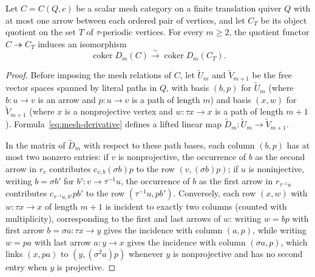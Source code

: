 \begin{proposition}
\label{prop:periodic-localization}
Let $C=C(Q,c)$ be a scalar mesh category on a finite translation quiver $Q$
with at most one arrow between each ordered pair of vertices, and let $C_T$
be its object quotient on the set $T$ of $\tau$-periodic vertices. For every
$m\geq2$, the quotient functor $C\twoheadrightarrow C_T$ induces an
isomorphism
\[
 \operatorname{coker}D_m(C)\xrightarrow{\sim}
 \operatorname{coker}D_m(C_T).
\]
\end{proposition}
\begin{proof}
Before imposing the mesh relations of $C$, let $\widetilde U_m$ and
$\widetilde V_{m+1}$ be the free vector spaces spanned by literal paths in
$Q$, with basis $(b,p)$ for $\widetilde U_m$ (where $b:u\to v$ is an arrow
and $p:u\to v$ is a path of length $m$) and basis $(x,w)$ for
$\widetilde V_{m+1}$ (where $x$ is a nonprojective vertex and
$w:\tau x\to x$ is a path of length $m+1$). Formula~\eqref{eq:mesh-derivative}
defines a lifted linear map $\widetilde D_m:\widetilde U_m\to\widetilde V_{m+1}$.

In the matrix of $\widetilde D_m$ with respect to these path bases, each
column $(b,p)$ has at most two nonzero entries: if $v$ is nonprojective, the
occurrence of $b$ as the second arrow in $r_v$ contributes
$c_{v,b}(\sigma b)p$ to the row $(v,(\sigma b)p)$; if $u$ is noninjective,
writing $b=\sigma b'$ for $b':v\to\tau^{-1}u$, the occurrence of $b$ as the
first arrow in $r_{\tau^{-1}u}$ contributes $c_{\tau^{-1}u,b'}pb'$ to the row
$(\tau^{-1}u,pb')$. Conversely, each row $(x,w)$ with $w:\tau x\to x$ of
length $m+1$ is incident to exactly two columns (counted with multiplicity),
corresponding to the first and last arrows of $w$: writing $w=bp$ with first
arrow $b=\sigma a:\tau x\to y$ gives the incidence with column $(a,p)$, while
writing $w=pa$ with last arrow $a:y\to x$ gives the incidence with column
$(\sigma a,p)$, which links $(x,pa)$ to $(y,(\sigma^2 a)p)$ whenever $y$ is
nonprojective and has no second entry when $y$ is projective.


\end{proof}
